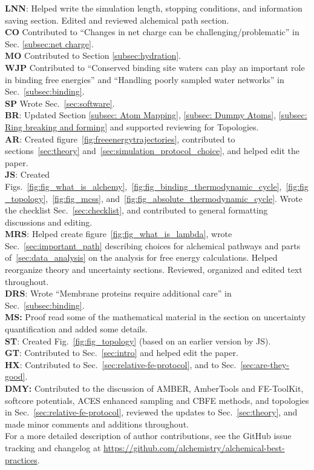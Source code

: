 \documentclass[9pt,bestpractices]{livecoms}
\newcommand{\githubrepository}{\url{https://github.com/alchemistry/alchemical-best-practices}} %
\begin{document}
\textbf{LNN}: Helped write the simulation length, stopping conditions, and information saving section. Edited and reviewed alchemical path section.\\
\textbf{CO} Contributed to ``Changes in net charge can be challenging/problematic'' in Sec. \ref{subsec:net charge}. \\
\textbf{MO} Contributed to Section \ref{subsec:hydration}.\\
\textbf{WJP} Contributed to ``Conserved binding site waters can play an important role in binding free energies'' and ``Handling poorly sampled water networks'' in Sec.~\ref{subsec:binding}.\\
\textbf{SP} Wrote Sec.~\ref{sec:software}. \\
\textbf{BR}: Updated Section \ref{subsec: Atom Mapping}, \ref{subsec: Dummy Atoms}, \ref{subsec: Ring breaking and forming} and supported reviewing for Topologies.\\
\textbf{AR}: Created figure~\ref{fig:freeenergytrajectories}, contributed to sections~\ref{sec:theory} and~\ref{sec:simulation_protocol_choice}, and helped edit the paper.\\
\textbf{JS}: Created Figs.~\ref{fig:fig_what_is_alchemy},~\ref{fig:fig_binding_thermodynamic_cycle},~\ref{fig:fig_topology},~\ref{fig:fig_mcss}, and~\ref{fig:fig_absolute_thermodynamic_cycle}. Wrote the checklist Sec.~\ref{sec:checklist}, and contributed to general formatting discussions and editing.\\
\textbf{MRS}: Helped create figure~\ref{fig:fig_what_is_lambda}, wrote Sec.~\ref{sec:important_path} describing choices for alchemical pathways and parts of~\ref{sec:data_analysis} on the analysis for free energy calculations. Helped reorganize theory and uncertainty sections. Reviewed, organized and edited text throughout.\\
\textbf{DRS}: Wrote ``Membrane proteins require additional care'' in Sec.~\ref{subsec:binding}.\\
\textbf{MS:} Proof read some of the mathematical material in the section on uncertainty quantification and added some details. \\
\textbf{ST}: Created Fig.~\ref{fig:fig_topology} (based on an earlier version by JS).\\
\textbf{GT}: Contributed to Sec.~\ref{sec:intro} and helped edit the paper.\\
\textbf{HX}: Contributed to Sec.~\ref{sec:relative-fe-protocol}, and to Sec.~\ref{sec:are-they-good}.\\
\textbf{DMY:} Contributed to the discussion of AMBER, AmberTools and FE-ToolKit, softcore potentials, ACES enhanced sampling and CBFE methods, and topologies in Sec.~\ref{sec:relative-fe-protocol}, reviewed the updates to Sec.~\ref{sec:theory}, and made minor comments and additions throughout. \\
For a more detailed description of author contributions,
see the GitHub issue tracking and changelog at \githubrepository.
\end{document}
